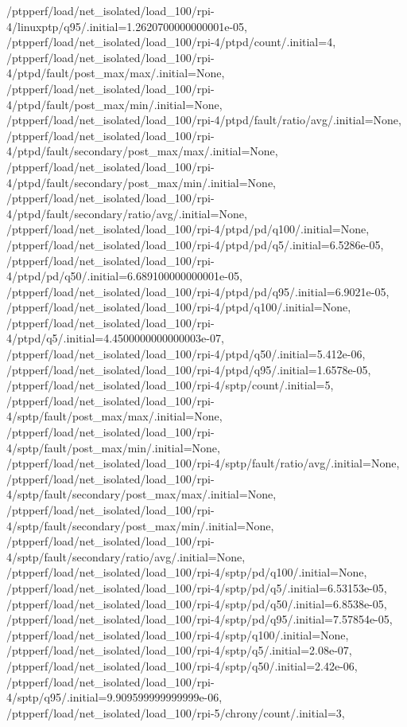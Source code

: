 {    /ptpperf/load/net_isolated/load_100/rpi-4/linuxptp/q95/.initial=1.2620700000000001e-05,
    /ptpperf/load/net_isolated/load_100/rpi-4/ptpd/count/.initial=4,
    /ptpperf/load/net_isolated/load_100/rpi-4/ptpd/fault/post_max/max/.initial=None,
    /ptpperf/load/net_isolated/load_100/rpi-4/ptpd/fault/post_max/min/.initial=None,
    /ptpperf/load/net_isolated/load_100/rpi-4/ptpd/fault/ratio/avg/.initial=None,
    /ptpperf/load/net_isolated/load_100/rpi-4/ptpd/fault/secondary/post_max/max/.initial=None,
    /ptpperf/load/net_isolated/load_100/rpi-4/ptpd/fault/secondary/post_max/min/.initial=None,
    /ptpperf/load/net_isolated/load_100/rpi-4/ptpd/fault/secondary/ratio/avg/.initial=None,
    /ptpperf/load/net_isolated/load_100/rpi-4/ptpd/pd/q100/.initial=None,
    /ptpperf/load/net_isolated/load_100/rpi-4/ptpd/pd/q5/.initial=6.5286e-05,
    /ptpperf/load/net_isolated/load_100/rpi-4/ptpd/pd/q50/.initial=6.689100000000001e-05,
    /ptpperf/load/net_isolated/load_100/rpi-4/ptpd/pd/q95/.initial=6.9021e-05,
    /ptpperf/load/net_isolated/load_100/rpi-4/ptpd/q100/.initial=None,
    /ptpperf/load/net_isolated/load_100/rpi-4/ptpd/q5/.initial=4.4500000000000003e-07,
    /ptpperf/load/net_isolated/load_100/rpi-4/ptpd/q50/.initial=5.412e-06,
    /ptpperf/load/net_isolated/load_100/rpi-4/ptpd/q95/.initial=1.6578e-05,
    /ptpperf/load/net_isolated/load_100/rpi-4/sptp/count/.initial=5,
    /ptpperf/load/net_isolated/load_100/rpi-4/sptp/fault/post_max/max/.initial=None,
    /ptpperf/load/net_isolated/load_100/rpi-4/sptp/fault/post_max/min/.initial=None,
    /ptpperf/load/net_isolated/load_100/rpi-4/sptp/fault/ratio/avg/.initial=None,
    /ptpperf/load/net_isolated/load_100/rpi-4/sptp/fault/secondary/post_max/max/.initial=None,
    /ptpperf/load/net_isolated/load_100/rpi-4/sptp/fault/secondary/post_max/min/.initial=None,
    /ptpperf/load/net_isolated/load_100/rpi-4/sptp/fault/secondary/ratio/avg/.initial=None,
    /ptpperf/load/net_isolated/load_100/rpi-4/sptp/pd/q100/.initial=None,
    /ptpperf/load/net_isolated/load_100/rpi-4/sptp/pd/q5/.initial=6.53153e-05,
    /ptpperf/load/net_isolated/load_100/rpi-4/sptp/pd/q50/.initial=6.8538e-05,
    /ptpperf/load/net_isolated/load_100/rpi-4/sptp/pd/q95/.initial=7.57854e-05,
    /ptpperf/load/net_isolated/load_100/rpi-4/sptp/q100/.initial=None,
    /ptpperf/load/net_isolated/load_100/rpi-4/sptp/q5/.initial=2.08e-07,
    /ptpperf/load/net_isolated/load_100/rpi-4/sptp/q50/.initial=2.42e-06,
    /ptpperf/load/net_isolated/load_100/rpi-4/sptp/q95/.initial=9.909599999999999e-06,
    /ptpperf/load/net_isolated/load_100/rpi-5/chrony/count/.initial=3,
}
